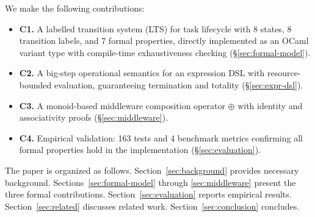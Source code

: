 We make the following contributions:
\begin{itemize}
  \item \textbf{C1.} A labelled transition system (LTS) for task lifecycle with 8 states, 8 transition labels, and 7 formal properties, directly implemented as an OCaml variant type with compile-time exhaustiveness checking (\S\ref{sec:formal-model}).
  \item \textbf{C2.} A big-step operational semantics for an expression DSL with resource-bounded evaluation, guaranteeing termination and totality (\S\ref{sec:expr-dsl}).
  \item \textbf{C3.} A monoid-based middleware composition operator $\oplus$ with identity and associativity proofs (\S\ref{sec:middleware}).
  \item \textbf{C4.} Empirical validation: 163 tests and 4 benchmark metrics confirming all formal properties hold in the implementation (\S\ref{sec:evaluation}).
\end{itemize}

The paper is organized as follows. Section~\ref{sec:background} provides necessary background. Sections~\ref{sec:formal-model} through \ref{sec:middleware} present the three formal contributions. Section~\ref{sec:evaluation} reports empirical results. Section~\ref{sec:related} discusses related work. Section~\ref{sec:conclusion} concludes.
